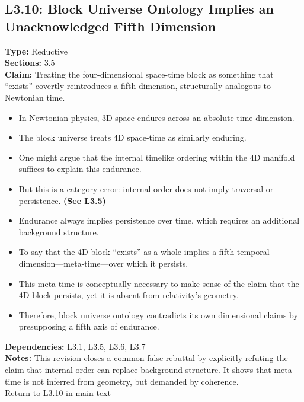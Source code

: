 \documentclass[12pt]{book}
\newcommand{\returnlink}[1]{\hyperref[logic:#1]{Return to #1 in main text}\xspace}
\begin{document}
\subsection*{L3.10: Block Universe Ontology Implies an Unacknowledged Fifth Dimension}\label{appendix:L3.10}
\textbf{Type:} Reductive \\
\textbf{Sections:} 3.5 \\
\textbf{Claim:} Treating the four-dimensional space-time block as something that ``exists'' covertly reintroduces a fifth dimension, structurally analogous to Newtonian time.
\begin{itemize}
  \item In Newtonian physics, 3D space endures across an absolute time dimension.
  \item The block universe treats 4D space-time as similarly enduring.
  \item One might argue that the internal timelike ordering within the 4D manifold suffices to explain this endurance.
  \item But this is a category error: internal order does not imply traversal or persistence. \textbf{(See L3.5)}
  \item Endurance always implies persistence over time, which requires an additional background structure.
  \item To say that the 4D block ``exists'' as a whole implies a fifth temporal dimension---meta-time---over which it persists.
  \item This meta-time is conceptually necessary to make sense of the claim that the 4D block persists, yet it is absent from relativity's geometry.
  \item Therefore, block universe ontology contradicts its own dimensional claims by presupposing a fifth axis of endurance.
\end{itemize}
\textbf{Dependencies:} L3.1, L3.5, L3.6, L3.7 \\
\textbf{Notes:} This revision closes a common false rebuttal by explicitly refuting the claim that internal order can replace background structure. It shows that meta-time is not inferred from geometry, but demanded by coherence.\\
\returnlink{L3.10}
\end{document}
